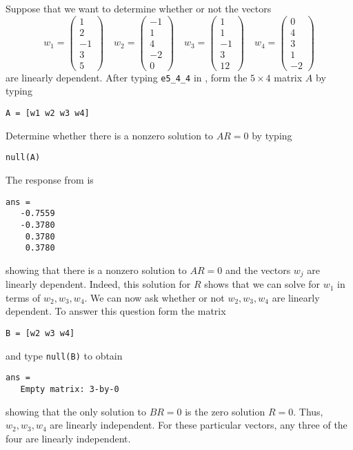 Suppose that we want to determine whether or not the vectors
\begin{equation*}
w_1 = \left(\begin{array}{r} 1 \\ 2 \\ -1 \\ 3 \\ 5 \end{array}\right)
\quad
w_2 = \left(\begin{array}{r} -1 \\ 1 \\ 4 \\ -2 \\ 0 \end{array}\right)
\quad
w_3 = \left(\begin{array}{r} 1 \\ 1 \\ -1 \\ 3 \\ 12 \end{array}\right)
\quad
w_4 = \left(\begin{array}{r} 0 \\ 4 \\ 3 \\ 1 \\ -2 \end{array}\right)
\end{equation*}%
are linearly dependent.  After typing {\tt e5\_4\_4} in \Matlabp, form
the $5\times 4$ matrix $A$ by typing
\begin{verbatim}
A = [w1 w2 w3 w4]
\end{verbatim}
Determine whether there is a nonzero solution to $AR=0$ by typing
\begin{verbatim}
null(A)
\end{verbatim} 
The response from \Matlab is
\begin{verbatim}
ans =
   -0.7559
   -0.3780
    0.3780
    0.3780
\end{verbatim}
showing that there is a nonzero solution to $AR=0$ and the vectors
$w_j$ are linearly dependent.  Indeed, this solution for $R$ shows
that we can solve for $w_1$ in terms of $w_2,w_3,w_4$.
We can now ask whether or not $w_2,w_3,w_4$ are linearly dependent.
To answer this question form the matrix
\begin{verbatim}
B = [w2 w3 w4]
\end{verbatim}
and type {\tt null(B)} to obtain
\begin{verbatim}
ans =
   Empty matrix: 3-by-0
\end{verbatim}
showing that the only solution to $BR=0$ is the zero solution $R=0$.
Thus, $w_2,w_3,w_4$ are linearly independent.  For these particular
vectors, any three of the four are linearly independent.

